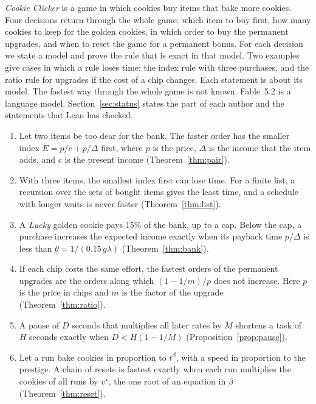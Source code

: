 \documentclass[11pt]{article}
\theoremstyle{boxed}
\begin{document}
\maketitleblock

\emph{Cookie Clicker} is a game in which cookies buy items that bake more cookies. Four
decisions return through the whole game: which item to buy first, how many cookies to keep for
the golden cookies, in which order to buy the permanent upgrades, and when to reset the game for
a permanent bonus. For each decision we state a model and prove the rule that is exact in that
model. Two examples give cases in which a rule loses time: the index rule with three purchases,
and the ratio rule for upgrades if the cost of a chip changes.
Each statement is about its model. The fastest way through the whole game is not known.
Fable~5.2 is a language model. Section~\ref{sec:status} states the part of each author and the
statements that Lean has checked.

\begin{enumerate}[leftmargin=1.6em]
\item Let two items be too dear for the bank. The faster order has the smaller index
$E=p/c+p/\Delta$ first, where $p$ is the price, $\Delta$ is the income that the item adds, and
$c$ is the present income (Theorem~\ref{thm:pair}).
\item With three items, the smallest index first can lose time. For a finite list, a recursion
over the sets of bought items gives the least time, and a schedule with longer waits is never
faster (Theorem~\ref{thm:list}).
\item A \emph{Lucky} golden cookie pays 15\% of the bank, up to a cap. Below the cap, a
purchase increases the expected income exactly when its payback time $p/\Delta$ is less than
$\theta=1/(0.15\,g\lambda)$ (Theorem~\ref{thm:bank}).
\item If each chip costs the same effort, the fastest orders of the permanent upgrades are the
orders along which $(1-1/m)/p$ does not increase. Here $p$ is the price in chips and $m$ is the
factor of the upgrade (Theorem~\ref{thm:ratio}).
\item A pause of $D$ seconds that multiplies all later rates by $M$ shortens a task of $H$
seconds exactly when $D<H(1-1/M)$ (Proposition~\ref{prop:pause}).
\item Let a run bake cookies in proportion to $t^{\beta}$, with a speed in proportion to the
prestige. A chain of resets is fastest exactly when each run multiplies the cookies of all runs
by $v^{\star}$, the one root of an equation in $\beta$ (Theorem~\ref{thm:reset}).
\end{enumerate}
\end{document}
